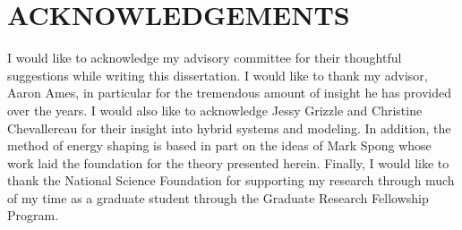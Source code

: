 %
%
%


\chapter*{ACKNOWLEDGEMENTS}



I would like to acknowledge my advisory committee for their thoughtful
suggestions while writing this dissertation.
%
I would like to thank my advisor, Aaron Ames, in particular for the tremendous
amount of insight he has provided over the years.
%
I would also like to acknowledge Jessy Grizzle and Christine Chevallereau for
their insight into hybrid systems and modeling.
%
In addition, the method of energy shaping is based in part on the ideas of Mark
Spong whose work laid the foundation for the theory presented herein.
%
Finally, I would like to thank the National Science Foundation for supporting my
research through much of my time as a graduate student through the Graduate
Research Fellowship Program.

\pagebreak{}
